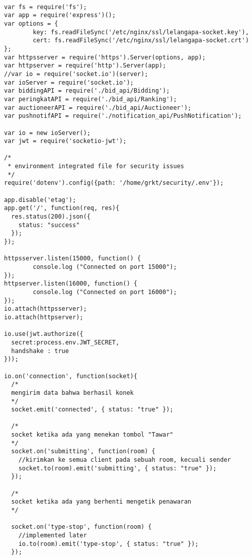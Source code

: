 \begin{lstlisting}[label=sc-socket-bid,style=htmlcssjs,caption=Implementasi Node.js + Socket.io untuk Lelang]

var fs = require('fs');
var app = require('express')();
var options = {
        key: fs.readFileSync('/etc/nginx/ssl/lelangapa-socket.key'),
        cert: fs.readFileSync('/etc/nginx/ssl/lelangapa-socket.crt')
};
var httpsserver = require('https').Server(options, app);
var httpserver = require('http').Server(app);
//var io = require('socket.io')(server);
var ioServer = require('socket.io');
var biddingAPI = require('./bid_api/Bidding');
var peringkatAPI = require('./bid_api/Ranking');
var auctioneerAPI = require('./bid_api/Auctioneer');
var pushnotifAPI = require('./notification_api/PushNotification');

var io = new ioServer();
var jwt = require('socketio-jwt');

/*  
 * environment integrated file for security issues
 */
require('dotenv').config({path: '/home/grkt/security/.env'});

app.disable('etag');
app.get('/', function(req, res){
  res.status(200).json({
    status: "success"
  });
});

httpsserver.listen(15000, function() {
        console.log ("Connected on port 15000");
});
httpserver.listen(16000, function() {
        console.log ("Connected on port 16000");
});
io.attach(httpsserver);
io.attach(httpserver);

io.use(jwt.authorize({
  secret:process.env.JWT_SECRET,
  handshake : true
}));

io.on('connection', function(socket){
  /*
  mengirim data bahwa berhasil konek
  */
  socket.emit('connected', { status: "true" });

  /*
  socket ketika ada yang menekan tombol "Tawar"
  */
  socket.on('submitting', function(room) {
    //kirimkan ke semua client pada sebuah room, kecuali sender
    socket.to(room).emit('submitting', { status: "true" });
  });

  /*
  socket ketika ada yang berhenti mengetik penawaran
  */

  socket.on('type-stop', function(room) {
    //implemented later
    io.to(room).emit('type-stop', { status: "true" });
  });


\end{lstlisting}
